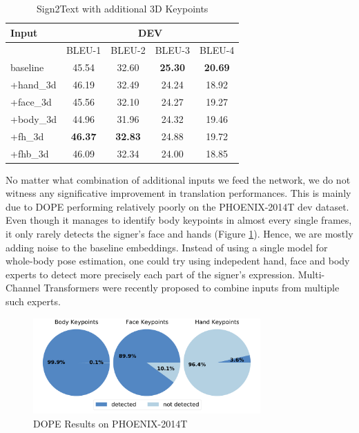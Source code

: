 \documentclass[final]{cvpr}
\begin{document}
\begin{table}[h]
	\centering
	\def\arraystretch{0.9}
	\begin{tabular}{l c c c c}
		\toprule
		Input &  \multicolumn{4}{c}{DEV}\\
		\midrule
		{}   & BLEU-1   & BLEU-2    & BLEU-3   & BLEU-4\\
		baseline  &  45.54 & 32.60  & \textbf{25.30}  & \textbf{20.69}\\
		+hand\_3d   &  46.19 & 32.49   & 24.24  & 18.92\\
		+face\_3d   &  45.56  &  32.10 & 24.27  & 19.27\\
		+body\_3d   &  44.96 &  31.96   & 24.32  & 19.46\\	
		+fh\_3d\footnotemark[3]  &  \textbf{46.37} &  \textbf{32.83}   & 24.88  & 19.72\\	
		+fhb\_3d\footnotemark[4]  &  46.09 &  32.34   & 24.00  & 18.85\\	
		\bottomrule
	\end{tabular}
	\vspace{-0.4\baselineskip}
	\caption{Sign2Text with additional 3D Keypoints}
	\label{tab:3d_keypoints}
\end{table}

No matter what combination of additional inputs we feed the network, we do not witness any significative improvement in translation performances. This is mainly due to DOPE performing relatively poorly on the PHOENIX-2014T dev dataset. Even though it manages to identify body keypoints in almost every single frames, it only rarely detects the signer's face and hands (Figure \ref{fig:pie_charts}). Hence, we are mostly adding noise to the baseline embeddings. 
Instead of using a single model for whole-body pose estimation, one could try using indepedent hand, face and body experts to detect more precisely each part of the signer's expression. Multi-Channel Transformers \cite{multi-channel} were recently proposed to combine inputs from multiple such experts.

\begin{figure}[H]
	\centering
	\includegraphics[width=8.7cm]{fig/keypoints.pdf}
	\vspace{-1.4\baselineskip}
	\caption{DOPE Results on  PHOENIX-2014T}
	\label{fig:pie_charts}
\end{figure} 
\end{document}
